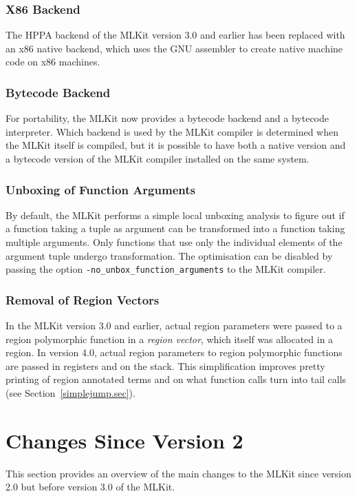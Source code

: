 \documentclass[12pt]{book}
\begin{document}
\subsubsection*{X86 Backend}
The
%
HPPA backend of the MLKit version 3.0 and earlier has been replaced
with an
%
x86 native backend, which uses the GNU assembler to create native
machine code on x86 machines.

\subsubsection*{Bytecode Backend}
%
For portability, the MLKit now provides a bytecode backend and a
bytecode interpreter. Which backend is used by the MLKit compiler is
determined when the MLKit itself is compiled, but it is possible to have
both a native version and a bytecode version of the MLKit compiler
installed on the same system.

\subsubsection*{Unboxing of Function Arguments}
%
%
%
By default, the MLKit performs a simple local unboxing analysis to
figure out if a function taking a tuple as argument can be transformed
into a function taking multiple arguments. Only functions that use
only the individual elements of the argument tuple undergo
transformation. The optimisation can be disabled by passing the option
\texttt{-no\_unbox\_function\_arguments} to the MLKit compiler.

\subsubsection*{Removal of Region Vectors}
%
In the MLKit version 3.0 and earlier, actual region parameters were
passed to a region polymorphic function in a {\em region vector},
which itself was allocated in a region. In version 4.0, actual region
parameters to
%
region polymorphic functions are passed in registers and on the stack.
This simplification improves pretty printing of region annotated terms
and on what function calls turn into tail calls (see
Section~\ref{simplejump.sec}).

\section{Changes Since Version 2}
%
This section provides an overview of the main changes to the MLKit
since version 2.0 but before version 3.0 of the MLKit.
\end{document}
